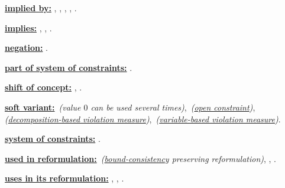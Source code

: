 \begin{ctrdesc}
\hyperlink{Limplied_by}{{\bf implied by:}}
\hyperlink{Calldifferent_consecutive_values}{},
\hyperlink{Ccircuit}{},
\hyperlink{Ccycle}{},
\hyperlink{Cstrictly_decreasing}{},
\hyperlink{Cstrictly_increasing}{}.

\hyperlink{Limplies}{{\bf implies:}}
\hyperlink{Calldifferent_except_0}{},
\hyperlink{Cmulti_global_contiguity}{},
\hyperlink{Cnot_all_equal}{}.

\hyperlink{Lnegation}{{\bf negation:}}
\hyperlink{Csome_equal}{}.

\hyperlink{Lpart_of_system_of_constraints}{{\bf part of system of constraints:}}
\hyperlink{Cneq}{}.

\hyperlink{Lshift_of_concept}{{\bf shift of concept:}}
\hyperlink{Calldifferent_on_intersection}{},
\hyperlink{Calldifferent_same_value}{}.

\hyperlink{Lsoft_variant}{{\bf soft variant:}}
\hyperlink{Calldifferent_except_0}{}\,\emph{(value $0$ can be used several times)},
\hyperlink{Copen_alldifferent}{}\,\emph{(\hyperlink{open_constraint}{open constraint})},
\hyperlink{Csoft_alldifferent_ctr}{}\,\emph{(\hyperlink{decomposition-based_violation_measure}{decomposition-based violation measure})},
\hyperlink{Csoft_alldifferent_var}{}\,\emph{(\hyperlink{variable-based_violation_measure}{variable-based violation measure})}.

\hyperlink{Lsystem_of_constraints}{{\bf system of constraints:}}
\hyperlink{Ck_alldifferent}{}.

\hyperlink{Lused_in_reformulation}{{\bf used in reformulation:}}
\hyperlink{Cin_interval_reified}{}\,\emph{(\hyperlink{bound-consistency}{bound-consistency} preserving reformulation)},
\hyperlink{Csort}{},
\hyperlink{Cstrictly_increasing}{}.

\hyperlink{Luses_in_its_reformulation}{{\bf uses in its reformulation:}}
\hyperlink{Ccycle}{},
\hyperlink{Celements_alldifferent}{},
\hyperlink{Csort_permutation}{}.


\end{ctrdesc}
